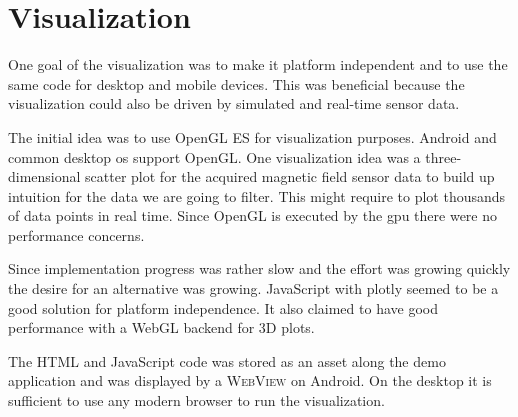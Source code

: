 \section{Visualization}

One goal of the visualization was to make it platform independent and to use the same code for desktop and mobile devices. This was beneficial because the visualization could also be driven by simulated and real-time sensor data.

The initial idea was to use OpenGL ES for visualization purposes. Android and common desktop \gls{os} support OpenGL. One visualization idea was a three-dimensional scatter plot for the acquired magnetic field sensor data to build up intuition for the data we are going to filter. This might require to plot thousands of data points in real time. Since OpenGL is executed by the \gls{gpu} there were no performance concerns.

Since implementation progress was rather slow and the effort was growing quickly the desire for an alternative was growing. JavaScript with plotly seemed to be a good solution for platform independence. It also claimed to have good performance with a WebGL backend for 3D plots.

The HTML and JavaScript code was stored as an asset along the demo application and was displayed by a \textsc{WebView} on Android. On the desktop it is sufficient to use any modern browser to run the visualization.
